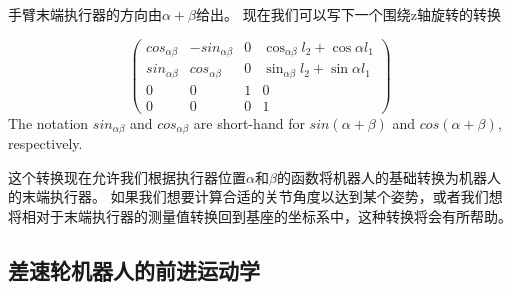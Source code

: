 
手臂末端执行器的方向由$ \alpha + \beta $给出。 现在我们可以写下一个围绕z轴旋转的转换

\begin{equation}
\label{eq:2armtrans}
\left(\begin{array}{llll}cos_{\alpha\beta} & -sin_{\alpha\beta} &  0 & \cos_{\alpha\beta}l_2+\cos\alpha l_1\\
                        sin_{\alpha\beta} & cos_{\alpha\beta} & 0 & \sin_{\alpha\beta}l_2+\sin\alpha l_1\\
												0 & 0 & 1 & 0\\
												0 & 0 & 0 & 1\end{array}\right)
\end{equation}
The notation $sin_{\alpha\beta}$ and $cos_{\alpha\beta}$ are short-hand for $sin(\alpha+\beta)$ and $cos(\alpha+\beta)$, respectively.


这个转换现在允许我们根据执行器位置$ \alpha $和$ \beta $的函数将机器人的基础转换为机器人的末端执行器。 如果我们想要计算合适的关节角度以达到某个姿势，或者我们想将相对于末端执行器的测量值转换回到基座的坐标系中，这种转换将会有所帮助。

\subsection{差速轮机器人的前进运动学}
\label{sec:fwkmobile}


